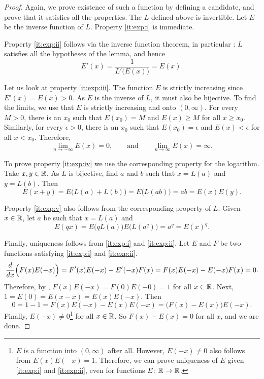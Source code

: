 \begin{proof}
Again, we prove existence of such a function by defining a candidate,
and prove that it satisfies all the properties.
The $L$ defined above is invertible.  Let $E$ be the
inverse function of $L$.  Property \ref{it:exp:i} is immediate.

Property \ref{it:exp:ii} follows
via the inverse function theorem, in particular
:  $L$ satisfies
all the hypotheses of the lemma, and hence
\begin{equation*}
E'(x) = \frac{1}{L'\bigl(E(x)\bigr)} = E(x) .
\end{equation*}

Let us look at property \ref{it:exp:iii}.
The function $E$ is strictly increasing since 
$E'(x) = E(x) > 0$.  As $E$ is the inverse of $L$, it must also
be bijective.  
To find the limits, we use that 
$E$ is strictly increasing and onto $(0,\infty)$.
For every $M > 0$, there is an $x_0$ such that
$E(x_0) = M$ and $E(x) \geq M$ for all $x \geq x_0$.
Similarly, for every $\epsilon > 0$, there is
an $x_0$ such that $E(x_0) = \epsilon$ and
$E(x) < \epsilon$ for all $x < x_0$.
Therefore,
\begin{equation*}
\lim_{n\to -\infty} E(x) = 0 , \qquad \text{and} \qquad
\lim_{n\to \infty} E(x) = \infty .
\end{equation*}

To prove property \ref{it:exp:iv} we use the corresponding
property for the logarithm.
Take $x, y \in {\mathbb{R}}$.
As $L$ is bijective, find $a$ and $b$ such that $x = L(a)$ and $y = L(b)$.  Then
\begin{equation*}
E(x+y) =
E\bigl(L(a)+L(b)\bigr) = 
E\bigl(L(ab)\bigr) = ab = E(x)E(y)  .
\end{equation*}

Property \ref{it:exp:v} also follows from the corresponding property of $L$.
Given $x \in {\mathbb{R}}$, let $a$ be such that $x = L(a)$ and
\begin{equation*}
E(qx) = E\bigl(qL(a)\bigr)
E\bigl(L(a^q)\bigr) = a^q = {E(x)}^q .
\end{equation*}

Finally, uniqueness follows from
\ref{it:exp:i} and
\ref{it:exp:ii}.
Let $E$ and $F$
be two functions satisfying
\ref{it:exp:i} and \ref{it:exp:ii}.  
\begin{equation*}
\frac{d}{dx} \Bigl( F(x)E(-x) \Bigr)
=
F'(x)E(-x) - E'(-x)F(x)
=
F(x)E(-x) - E(-x)F(x) = 0 .
\end{equation*}
Therefore, by ,
$F(x)E(-x) = F(0)E(-0) = 1$ for all $x \in {\mathbb{R}}$.
Next, $1 = E(0) = E(x-x) = E(x)E(-x)$.
Then
\begin{equation*}
0 = 1-1 = F(x)E(-x) - E(x)E(-x) = \bigl(F(x)-E(x)\bigr) E(-x) .
\end{equation*}
Finally, $E(-x) \not= 0$\footnote{%
$E$ is a function into $(0,\infty)$ after all.
However, $E(-x) \neq 0$ also follows
from $E(x)E(-x) = 1$.  Therefore, we can prove uniqueness of $E$ 
given \ref{it:exp:i} and \ref{it:exp:ii}, even for functions $E \colon {\mathbb{R}}
\to {\mathbb{R}}$.}
for all $x \in {\mathbb{R}}$.
So
$F(x)-E(x) = 0$ for all $x$, and we are done.
\end{proof}

